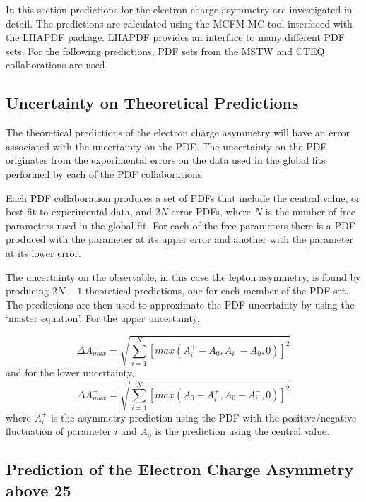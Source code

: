 In this section predictions for the electron charge asymmetry are investigated in
detail.  The predictions are calculated using the MCFM\cite{campbellmcfm} {MC} tool
interfaced with the LHAPDF package\cite{whalley2005houches}.  LHAPDF provides an
interface to many different {PDF} sets. For the following predictions, PDF sets from
the MSTW \cite{martin2009parton} and CTEQ \cite{lai2010vv} collaborations are
used.

\subsection{Uncertainty on Theoretical Predictions}
The theoretical predictions of the electron charge asymmetry will have an error
associated with the uncertainty on the {PDF}.
The uncertainty on the {PDF} originates from the experimental errors on the
data used in the global fits performed by each of the {PDF} collaborations.



Each {PDF} collaboration produces a set of {PDFs} that include the
central value, or best fit to experimental data, and $2N$ error {PDFs}, where
$N$ is the number of free parameters used in the global
fit\cite{Bourilkov:2006cj}.
For each of the free parameters there is a PDF produced with the parameter at its upper
error and another with the parameter at its lower error. 

The uncertainty on the observable, in this case the lepton asymmetry, is found
by producing $2N+1$ theoretical predictions, one for each member of the {PDF}
set. The predictions are then used to approximate the {PDF} uncertainty by
using the `master equation'\cite{Bourilkov:2006cj,campbell2006hard}.
For the upper uncertainty,

\begin{equation}
\Delta A^{+}_{max}
= \sqrt{ \sum^{N}_{i=1} \left[ max( A^{+}_i-A_{0}, A^{-}_i-A_{0}, 0 ) \right]^{2}}
\end{equation}
and for the lower uncertainty,
\begin{equation}
\Delta A^{-}_{max}
= \sqrt{ \sum^{N}_{i=1} \left[ max( A_{0}-A^{+}_i, A_{0}-A^{-}_i, 0 ) \right]^{2}}
\end{equation}
where $A^{\pm}_{i}$ is the asymmetry prediction using the {PDF} with the
positive/negative fluctuation of parameter $i$ and $A_{0}$ is the prediction
using the central value.

\subsection{Prediction of the Electron Charge Asymmetry above \unit{25}{\GeV}}

